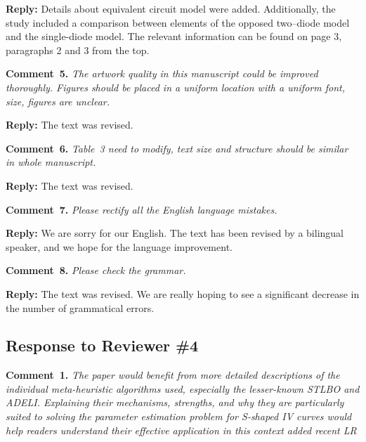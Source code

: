 \documentclass[a4paper,fleqn]{cas-sc}
\begin{document}
\noindent
\textcolor[rgb]{0.51,0.00,0.00}{\textbf{Reply:}}
Details about equivalent circuit model were added.
Additionally, the study included a comparison between elements of
the opposed two--diode model and the single-diode model.
The relevant information can be found on page 3, paragraphs 2 and 3 from the top.


\vspace{1cm}
\noindent
\textcolor[rgb]{0.00,0.50,1.00}{\textbf{Comment~5.}}
\emph{The artwork quality in this manuscript could be improved thoroughly.
Figures should be placed in a uniform location with a uniform font, size, figures are unclear.}

\noindent
\textcolor[rgb]{0.51,0.00,0.00}{\textbf{Reply:}}
The text was revised.

\vspace{1cm}
\noindent
\textcolor[rgb]{0.00,0.50,1.00}{\textbf{Comment~6.}}
\emph{Table~3 need to modify, text size and structure should be similar in whole manuscript.}

\noindent
\textcolor[rgb]{0.51,0.00,0.00}{\textbf{Reply:}}
The text was revised.

\vspace{1cm}
\noindent
\textcolor[rgb]{0.00,0.50,1.00}{\textbf{Comment~7.}}
\emph{Please rectify all the English language mistakes.}

\noindent
\textcolor[rgb]{0.51,0.00,0.00}{\textbf{Reply:}}
We are sorry for our English.
The text has been revised by a bilingual speaker, and we hope for the language improvement.


\vspace{1cm}
\noindent
\textcolor[rgb]{0.00,0.50,1.00}{\textbf{Comment~8.}}
\emph{Please check the grammar.}

\noindent
\textcolor[rgb]{0.51,0.00,0.00}{\textbf{Reply:}}
The text was revised.
We are really hoping to see a significant decrease in the number of grammatical errors.

\vspace{1cm}
\subsection*{Response to Reviewer \#4 }


\noindent
\textcolor[rgb]{0.00,0.50,1.00}{\textbf{Comment~1.}}
\emph{The paper would benefit from more detailed descriptions of the individual meta-heuristic algorithms used,
especially the lesser-known STLBO and ADELI.
Explaining their mechanisms, strengths, and why they are particularly suited to solving the parameter estimation problem
for S-shaped IV curves would help readers understand their effective application in this
context added recent LR}
\end{document}
